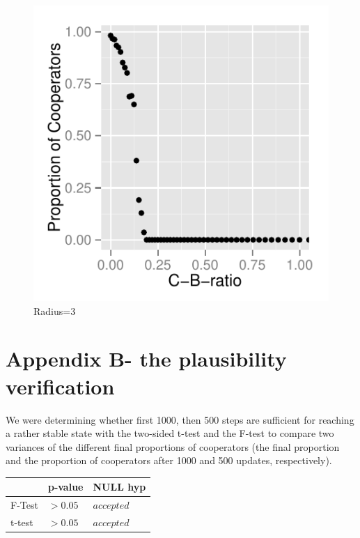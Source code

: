 \documentclass[DIV=calc, paper=a4, fontsize=11pt, twocolumn]{scrartcl}	 %
\begin{document}
\begin{figure}[here]
\centering
\begin{minipage}{.35\textwidth}
  \centering
  \includegraphics[width=1\linewidth]{PDN3}
 \caption{Radius=3}
\label{fig:PDm3}
\end{minipage}%
\end{figure}

\section*{Appendix B- the plausibility verification}
\label{sec:appendix}
\noindent We were determining whether first 1000, then 500 steps are sufficient for reaching a rather stable state with the two-sided t-test and the F-test to compare two variances of the different final proportions of cooperators (the final proportion and the proportion of cooperators after 1000 and 500 updates, respectively). \\

\begin{tabular}{l|ll}
\centering
  & p-value & NULL hyp \\
\midrule
F-Test & $>0.05$ & $accepted$ \\
t-test & $>0.05$ & $accepted$ \\
\end{tabular}
\end{document}
